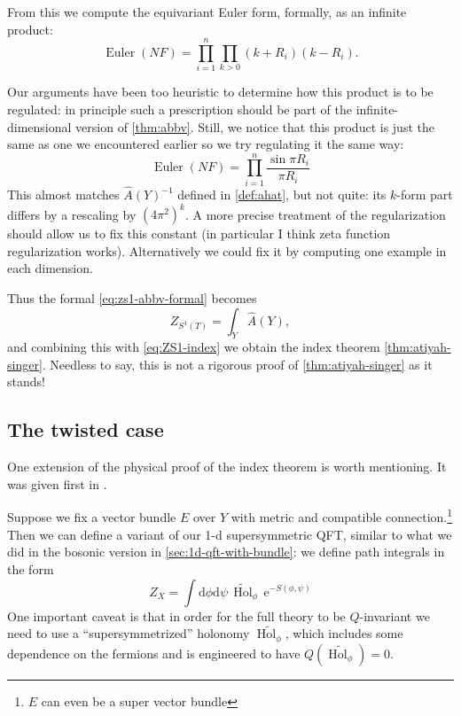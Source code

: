 \documentclass[12pt,letterpaper,reqno]{article}
\numberwithin{equation}{section}
\newcommand{\e}{{\mathrm e}}
\newcommand{\de}{\mathrm{d}}
\DeclareMathOperator{\Hol}{Hol}
\DeclareMathOperator{\Euler}{Euler}
\newcommand{\fixme}[1]{{\color{orange}{[#1]}}}
\begin{document}
From this we compute the equivariant Euler form, formally, as an infinite product:
\begin{equation}
  \Euler(NF) = \prod_{i=1}^n \prod_{k > 0} (k + R_i) (k - R_i).
\end{equation} 

Our arguments have been too heuristic to determine how this product is to be regulated:
in principle such a prescription should be part of the infinite-dimensional 
version of \autoref{thm:abbv}.
Still, we notice that this product is just the same as one we encountered earlier \fixme{...}
so we try regulating it the same way:
\begin{equation}
  \Euler(NF) = \prod_{i=1}^n \frac{\sin \pi R_i}{\pi R_i}
\end{equation}
This almost matches $\hat A(Y)^{-1}$ defined in \autoref{def:ahat}, 
but not quite: its $k$-form part 
differs by a rescaling by $(4 \pi^2)^k$.
A more precise treatment of the regularization should allow us to
fix this constant (in particular I think zeta function regularization works).
Alternatively we could fix it by computing one example in each dimension.

Thus the formal \eqref{eq:zs1-abbv-formal} becomes
\begin{equation}
  Z_{S^1(T)} = \int_Y \hat A(Y),
\end{equation}
and combining this with \eqref{eq:ZS1-index}
we obtain the index theorem \autoref{thm:atiyah-singer}.
Needless to say, this is not a rigorous proof of \autoref{thm:atiyah-singer}
as it stands!


\subsection{The twisted case}

One extension of the physical proof of the index theorem 
is worth mentioning. It was given first in \cite{Friedan1984}.

Suppose we fix a vector bundle $E$ over $Y$
with metric and compatible connection.\footnote{$E$ can even be a super vector bundle
\fixme{...}}
Then we can define a variant of our 1-d supersymmetric QFT,
similar to what we did in the bosonic version in \autoref{sec:1d-qft-with-bundle}:
we define path integrals in the form
\begin{equation}
  Z_X = \int \de \phi \de \psi \, \widetilde{\Hol}_\phi \, \e^{-S(\phi,\psi)}
\end{equation}
One important caveat is that in order for the full theory to be $Q$-invariant
we need to use a ``supersymmetrized'' holonomy $\widetilde{\Hol_\phi}$, which includes
some dependence on the fermions and is engineered to have $Q (\widetilde{\Hol_\phi}) = 0$.
\end{document}
